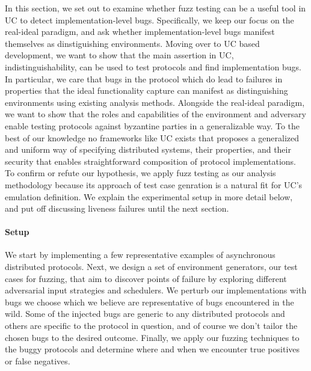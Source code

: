 In this section, we set out to examine whether fuzz testing can be a useful tool in UC to detect implementation-level bugs.
Specifically, we keep our focus on the real-ideal paradigm, and ask whether implementation-level bugs manifest themselves as dinstiguishing environments.
Moving over to UC based development, we want to show that the main assertion in UC, indistinguishability, can be used to test protocols and find implementation bugs.
In particular, we care that bugs in the protocol which do lead to failures in properties that the ideal functionality capture can manifest as distinguishing environments using existing analysis methods.
Alongside the real-ideal paradigm, we want to show that the roles and capabilities of the environment and adversary enable testing protocols against byzantine parties in a generalizable way.
To the best of our knowledge no frameworks like UC exists that proposes a generalized and uniform way of specifying distributed systems, their properties, and their security that enables straightforward composition of protocol implementations.
To confirm or refute our hypothesis, we apply fuzz testing as our analysis methodology because its approach of test case genration is a natural fit for UC's emulation definition.
We explain the experimental setup in more detail below, and put off discussing liveness failures until the next section.


\paragraph{Setup}
We start by implementing a few representative examples of asynchronous distributed protocols.
Next, we design a set of environment generators, our test cases for fuzzing, that aim to discover points of failure by exploring different adversarial input strategies and schedulers.
We perturb our implementations with bugs we choose which we believe are representative of bugs encountered in the wild.
Some of the injected bugs are generic to any distributed protocols and others are specific to the protocol in question, and of course we don't tailor the chosen bugs to the desired outcome.
Finally, we apply our fuzzing techniques to the buggy protocols and determine where and when we encounter true positives or false negatives. 

